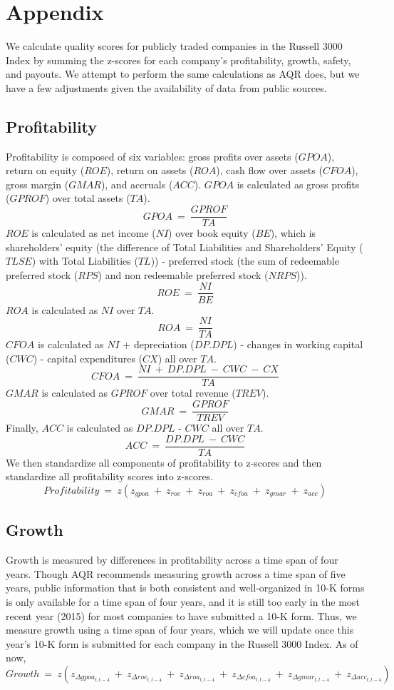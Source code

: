 \documentclass[titlepage]{article}
\begin{document}
\section*{Appendix}
We calculate quality scores for publicly traded companies in the Russell 3000 Index by summing the z-scores for each company's profitability, growth, safety, and payouts. We attempt to perform the same calculations as AQR does, but we have a few adjustments given the availability of data from public sources. 
\subsection*{Profitability}
Profitability is composed of six variables: gross profits over assets ($GPOA$), return on equity ($ROE$), return on assets ($ROA$), cash flow over assets ($CFOA$), gross margin ($GMAR$), and accruals ($ACC$). $GPOA$ is calculated as gross profits ($GPROF$) over total assets ($TA$). $$GPOA \ = \ \frac{GPROF}{TA}$$ $ROE$ is calculated as net income ($NI$) over book equity ($BE$), which is shareholders' equity (the difference of Total Liabilities and Shareholders' Equity ($TLSE$) with Total Liabilities ($TL$)) - preferred stock (the sum of redeemable preferred stock ($RPS$) and non redeemable preferred stock ($NRPS$)). $$ROE \ = \ \frac{NI}{BE}$$ $ROA$ is calculated as $NI$ over $TA$. $$ROA \ = \ \frac{NI}{TA}$$ $CFOA$ is calculated as $NI$ + depreciation ($DP.DPL$) - changes in working capital ($CWC$) - capital expenditures ($CX$) all over $TA$. $$CFOA \ = \ \frac{NI \ + \ DP.DPL \ - \ CWC \ - \ CX}{TA}$$ $GMAR$ is calculated as $GPROF$ over total revenue ($TREV$). $$GMAR \ = \ \frac{GPROF}{TREV}$$ Finally, $ACC$ is calculated as $DP.DPL$ - $CWC$ all over $TA$. $$ACC \ = \ \frac{DP.DPL \ - \ CWC}{TA}$$ We then standardize all components of profitability to z-scores and then standardize all profitability scores into z-scores. $$Profitability \ = \ z(z_{gpoa} \ + \ z_{roe} \ + \ z_{roa} \ + \ z_{cfoa} \ + \ z_{gmar} \ + \ z_{acc})$$
\subsection*{Growth}
Growth is measured by differences in profitability across a time span of four years. Though AQR recommends measuring growth across a time span of five years, public information that is both consistent and well-organized in 10-K forms is only available for a time span of four years, and it is still too early in the most recent year (2015) for most companies to have submitted a 10-K form. Thus, we measure growth using a time span of four years, which we will update once this year's 10-K form is submitted for each company in the Russell 3000 Index. As of now, $$Growth \ = \ z(z_{\Delta gpoa_{t,t-4}} \ + \ z_{\Delta roe_{t,t-4}} \ + \ z_{\Delta roa_{t,t-4}} \ + \ z_{\Delta cfoa_{t,t-4}} \ + \ z_{\Delta gmar_{t,t-4}} \ + \ z_{\Delta acc_{t,t-4}})$$
\end{document}
